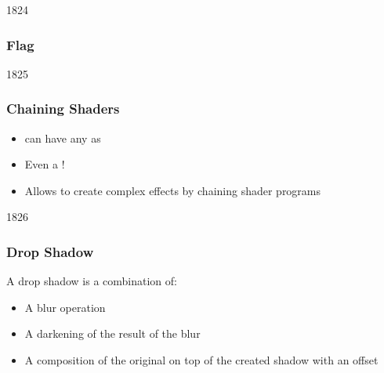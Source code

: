 
\begin{slide}{1824}\frametitle{Flag}


\vspace*{-20em}\hfill{}
\end{slide}


\begin{slide}{1825}\frametitle{Chaining Shaders}

\begin{itemize}
\item {} can have any  as 
\item Even a !
\item Allows to create complex effects by chaining shader programs
\end{itemize}

\end{slide}


\begin{slide}{1826}\frametitle{Drop Shadow}

\vspace*{2em}
A drop shadow is a combination of:

\begin{itemize}
\item A blur operation
\item A darkening of the result of the blur
\item A composition of the original on top of the created shadow with an offset
\end{itemize}

\end{slide}


